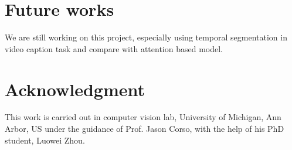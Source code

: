 \section{Future works}
We are still working on this project, especially using temporal segmentation in video caption task and compare with attention based model.

\section{Acknowledgment}
This work is carried out in computer vision lab, University of Michigan, Ann Arbor, US under the guidance of Prof. Jason Corso, with the help of his PhD student, Luowei Zhou.




